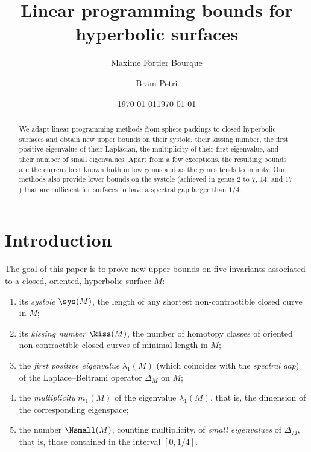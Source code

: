 \documentclass[12pt]{amsart}
\title[Linear programming bounds for hyperbolic surfaces]{Linear programming bounds for hyperbolic surfaces}
\author{Maxime Fortier Bourque}
\author{Bram Petri}
\date{\today}
\date{\today}
\numberwithin{equation}{section}
\begin{document}
\begin{abstract}
We adapt linear programming methods from sphere packings to closed hyperbolic surfaces and obtain new upper bounds on their systole, their kissing number, the first positive eigenvalue of their Laplacian, the multiplicity of their first eigenvalue, and their number of small eigenvalues. Apart from a few exceptions, the resulting bounds are the current best known both in low genus and as the genus tends to infinity. Our methods also provide lower bounds on the systole (achieved in genus $2$ to $7$, $14$, and $17$) that are sufficient for surfaces to have a spectral gap larger than $1/4$.  \\
\end{abstract}


\maketitle

\section{Introduction}

The goal of this paper is to prove new upper bounds on five invariants associated to a closed, oriented, hyperbolic surface $M$:
\begin{enumerate}
\item its \emph{systole} $\sys(M)$, the length of any shortest non-contractible closed curve in $M$;
\item its \emph{kissing number} $\kiss(M)$, the number of homotopy classes of oriented non-contractible closed curves of minimal length in $M$;
\item the \emph{first positive eigenvalue} $\lambda_1(M)$ (which coincides with the \emph{spectral gap}) of the Laplace--Beltrami operator $\Delta_M$ on $M$;
\item the \emph{multiplicity} $m_1(M)$ of the eigenvalue $\lambda_1(M)$, that is, the dimension of the corresponding eigenspace;
\item the number $\Nsmall(M)$, counting multiplicity, of \emph{small eigenvalues} of $\Delta_M$, that is, those contained in the interval $[0,1/4]$.
\end{enumerate}
\end{document}
